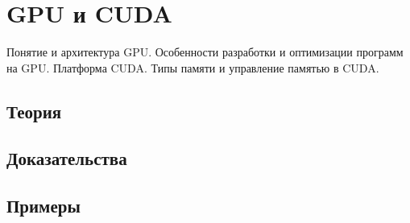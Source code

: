 
\section{GPU и CUDA}
\label{sec:1.3.11-gpu-cuda}

\begin{ticket}
Понятие и архитектура GPU. Особенности разработки и оптимизации программ на GPU. Платформа CUDA. Типы памяти и управление памятью в CUDA.
\end{ticket}

\subsection*{Теория}

\subsection*{Доказательства}

\subsection*{Примеры}
